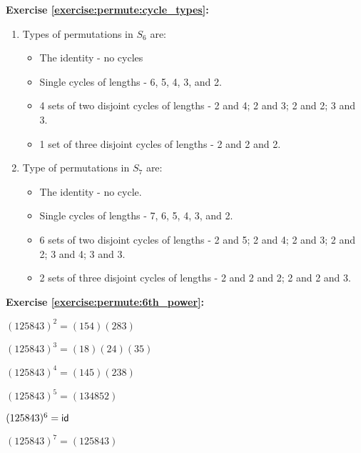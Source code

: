 \noindent\textbf{Exercise \ref{exercise:permute:cycle_types}:}
\begin{enumerate}[{a.}]
\item
Types of permutations in $S_6$ are:
	\begin{itemize}
	\item
	The identity - no cycles
	
	\item
	Single cycles of lengths - 6, 5, 4, 3, and 2.
	
	\item
	4 sets of two disjoint cycles of lengths - 2 and 4; 2 and 3; 2 and 2; 3 and 3.
	
	\item
	1 set of three disjoint cycles of lengths - 2 and 2 and 2.
	\end{itemize}
	
\item
Type of permutations in $S_7$ are:
	\begin{itemize}
	\item
	The identity - no cycle.
	
	\item
	Single cycles of lengths - 7, 6, 5, 4, 3, and 2.
	
	\item
	6 sets of two disjoint cycles of lengths - 2 and 5; 2 and 4; 2 and 3; 2 and 2; 3 and 4; 3 and 3.
	
	\item
	2 sets of three disjoint cycles of lengths - 2 and 2 and 2; 2 and 2 and 3.
	\end{itemize}
\end{enumerate}

\noindent\textbf{Exercise \ref{exercise:permute:6th_power}:}
\begin{enumerate}[{a.}]
\begin{multicols}{2}
\item
$(125843)^2 = (154)(283)$

\item
$(125843)^3 = (18)(24)(35)$

\item
$(125843)^4 = (145)(238)$

\item
$(125843)^5 = (134852)$

\item
$(125843)^6 = \sf{id}$

\item
$(125843)^7 = (125843)$
\end{multicols}
\end{enumerate}

